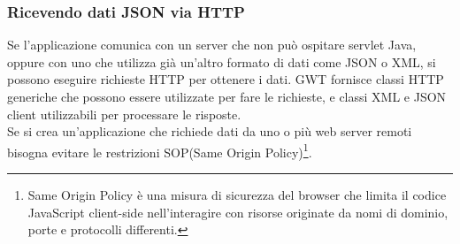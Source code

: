 \subsubsection*{Ricevendo dati JSON via HTTP}
Se l'applicazione comunica con un server che non pu\`o ospitare servlet Java, oppure con uno che utilizza gi\`a un'altro formato di dati come JSON o XML, si possono eseguire richieste HTTP per ottenere i dati. GWT fornisce classi HTTP generiche che possono essere utilizzate per fare le richieste, e classi XML e JSON client utilizzabili per processare le risposte.\\
Se si crea un'applicazione che richiede dati da uno o pi\`u web server remoti bisogna evitare le restrizioni SOP(Same Origin Policy)\footnote{Same Origin Policy \`e una misura di sicurezza del browser che limita il codice JavaScript client-side nell'interagire con risorse originate da nomi di dominio, porte e protocolli differenti.}.
